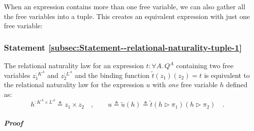 When an expression contains more than one free variable, we can also
gather all the free variables into a tuple. This creates an equivalent
expression with just one free variable:

\subsubsection{Statement \label{subsec:Statement--relational-naturality-tuple-1}\ref{subsec:Statement--relational-naturality-tuple-1} }

The relational naturality law for an expression $t:\forall A.\,Q^{A}$
containing two free variables $z_{1}^{:K^{A}}$ and $z_{2}^{:L^{A}}$
and the binding function $\tilde{t}(z_{1})(z_{2})=t$ is equivalent
to the relational naturality law for the expression $u$ with \emph{one}
free variable $h$ defined as:
\[
h^{:K^{A}\times L^{A}}\triangleq z_{1}\times z_{2}\quad,\quad\quad u\triangleq\tilde{u}(h)\triangleq\tilde{t}(h\triangleright\pi_{1})(h\triangleright\pi_{2})\quad.
\]


\subparagraph{Proof}

